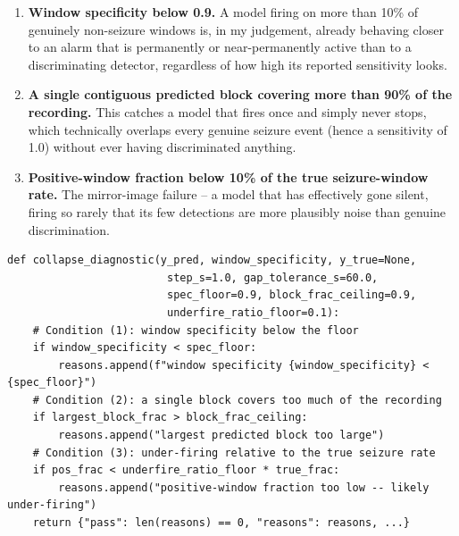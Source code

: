 \begin{enumerate}
    \item \textbf{Window specificity below 0.9.} A model firing on more than 10\% of genuinely non-seizure windows is, in my judgement, already behaving closer to an alarm that is permanently or near-permanently active than to a discriminating detector, regardless of how high its reported sensitivity looks.
    \item \textbf{A single contiguous predicted block covering more than 90\% of the recording.} This catches a model that fires once and simply never stops, which technically overlaps every genuine seizure event (hence a sensitivity of 1.0) without ever having discriminated anything.
    \item \textbf{Positive-window fraction below 10\% of the true seizure-window rate.} The mirror-image failure -- a model that has effectively gone silent, firing so rarely that its few detections are more plausibly noise than genuine discrimination.
\end{enumerate}


\begin{verbatim}
def collapse_diagnostic(y_pred, window_specificity, y_true=None,
                         step_s=1.0, gap_tolerance_s=60.0,
                         spec_floor=0.9, block_frac_ceiling=0.9,
                         underfire_ratio_floor=0.1):
    # Condition (1): window specificity below the floor
    if window_specificity < spec_floor:
        reasons.append(f"window specificity {window_specificity} < {spec_floor}")
    # Condition (2): a single block covers too much of the recording
    if largest_block_frac > block_frac_ceiling:
        reasons.append("largest predicted block too large")
    # Condition (3): under-firing relative to the true seizure rate
    if pos_frac < underfire_ratio_floor * true_frac:
        reasons.append("positive-window fraction too low -- likely under-firing")
    return {"pass": len(reasons) == 0, "reasons": reasons, ...}
\end{verbatim}

